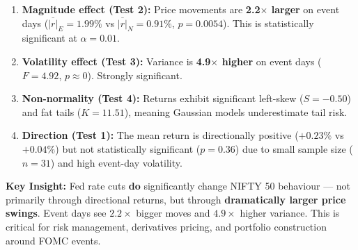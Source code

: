 \documentclass[12pt,a4paper]{article}
\begin{document}
\begin{enumerate}
    \item \textbf{Magnitude effect (Test 2):} Price movements are \textbf{2.2$\times$ larger} on event days ($\overline{|r|}_E = 1.99\%$ vs $\overline{|r|}_N = 0.91\%$, $p = 0.0054$). This is statistically significant at $\alpha = 0.01$.
    \item \textbf{Volatility effect (Test 3):} Variance is \textbf{4.9$\times$ higher} on event days ($F = 4.92$, $p \approx 0$). Strongly significant.
    \item \textbf{Non-normality (Test 4):} Returns exhibit significant left-skew ($S = -0.50$) and fat tails ($K = 11.51$), meaning Gaussian models underestimate tail risk.
    \item \textbf{Direction (Test 1):} The mean return is directionally positive ($+0.23\%$ vs $+0.04\%$) but not statistically significant ($p = 0.36$) due to small sample size ($n = 31$) and high event-day volatility.
\end{enumerate}

\textbf{Key Insight:} Fed rate cuts \textbf{do} significantly change NIFTY 50 behaviour --- not primarily through directional returns, but through \textbf{dramatically larger price swings}. Event days see $2.2\times$ bigger moves and $4.9\times$ higher variance. This is critical for risk management, derivatives pricing, and portfolio construction around FOMC events.
\end{document}
